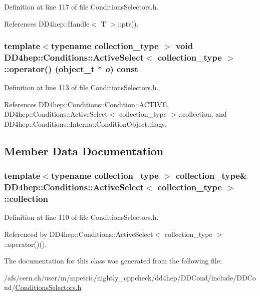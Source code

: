 Definition at line 117 of file ConditionsSelectors.h.

References DD4hep::Handle$<$ T $>$::ptr().\hypertarget{class_d_d4hep_1_1_conditions_1_1_active_select_ae3a46620dcdeca50694da7eb82163e05}{
\subsubsection[{operator()}]{\setlength{\rightskip}{0pt plus 5cm}template$<$typename collection\_\-type $>$ void {\bf DD4hep::Conditions::ActiveSelect}$<$ collection\_\-type $>$::operator() ({\bf object\_\-t} $\ast$ {\em o}) const}}
\label{class_d_d4hep_1_1_conditions_1_1_active_select_ae3a46620dcdeca50694da7eb82163e05}


Definition at line 113 of file ConditionsSelectors.h.

References DD4hep::Conditions::Condition::ACTIVE, DD4hep::Conditions::ActiveSelect$<$ collection\_\-type $>$::collection, and DD4hep::Conditions::Interna::ConditionObject::flags.

\subsection{Member Data Documentation}
\hypertarget{class_d_d4hep_1_1_conditions_1_1_active_select_a413343e5a2aaf171132771e5ad3e0f5d}{
\subsubsection[{collection}]{\setlength{\rightskip}{0pt plus 5cm}template$<$typename collection\_\-type $>$ collection\_\-type\& {\bf DD4hep::Conditions::ActiveSelect}$<$ collection\_\-type $>$::{\bf collection}}}
\label{class_d_d4hep_1_1_conditions_1_1_active_select_a413343e5a2aaf171132771e5ad3e0f5d}


Definition at line 110 of file ConditionsSelectors.h.

Referenced by DD4hep::Conditions::ActiveSelect$<$ collection\_\-type $>$::operator()().

The documentation for this class was generated from the following file:\begin{DoxyCompactItemize}
\item 
/afs/cern.ch/user/m/mpetric/nightly\_\-cppcheck/dd4hep/DDCond/include/DDCond/\hyperlink{_conditions_selectors_8h}{ConditionsSelectors.h}\end{DoxyCompactItemize}

